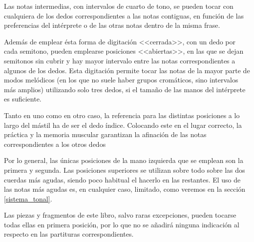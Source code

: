 Las notas intermedias, con intervalos de cuarto de tono, se pueden tocar con cualquiera de los dedos correspondientes a las notas contiguas, en función de las preferencias del intérprete o de las otras notas dentro de la misma frase.

Además de emplear ésta forma de digitación <<cerrada>>, con un dedo por cada semitono, pueden emplearse posiciones <<abiertas>>, en las que se dejan semitonos sin cubrir y hay mayor intervalo entre las notas correspondientes a algunos de los dedos. Esta digitación permite tocar las notas de la mayor parte de modos melódicos (en los que no suele haber grupos cromáticos, sino intervalos más amplios) utilizando solo tres dedos, si el tamaño de las manos del intérprete es suficiente.

Tanto en uno como en otro caso, la referencia para las distintas posiciones a lo largo del mástil ha de ser el dedo índice. Colocando este en el lugar correcto, la práctica y la memoria muscular garantizan la afinación de las notas correspondientes a los otros dedos

Por lo general, las únicas posiciones de la mano izquierda que se emplean son la primera y segunda. Las posiciones superiores se utilizan sobre todo sobre las dos cuerdas más agudas, siendo poco habitual el hacerlo en las restantes. El uso de las notas más agudas es, en cualquier caso, limitado, como veremos en la sección \ref{sistema_tonal}.

Las piezas y fragmentos de este libro, salvo raras excepciones, pueden tocarse todas ellas en primera posición, por lo que no se añadirá ninguna indicación al respecto en las partituras correspondientes.

\pagestyle{empty}